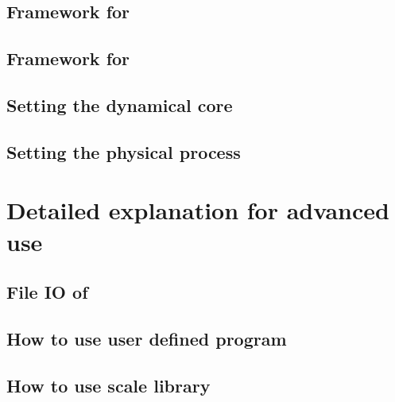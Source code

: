 \documentclass[a4paper]{report}
\begin{document}
 \chapter{Framework for \scalerm}
 
 
 
 
 
 \clearpage
 
 
 
 
 
 
 
 

 \chapter{Framework for \scalegm}
 

 \chapter{Setting the dynamical core} 
 

 \chapter{Setting the physical process} \label{sec:basic_usel_physics}
 

\part{Detailed explanation for advanced use} \label{part:advance_use}
 \chapter{File IO of \scalelib}
 

 \chapter{How to use user defined program}
 \chapter{How to use scale library}
\end{document}
